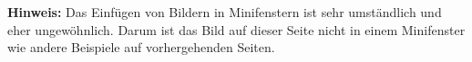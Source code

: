 
\textbf{Hinweis:} Das Einfügen von Bildern in Minifenstern ist sehr umständlich und eher ungewöhnlich. Darum ist das Bild auf dieser Seite nicht in einem Minifenster wie andere Beispiele auf vorhergehenden Seiten.

